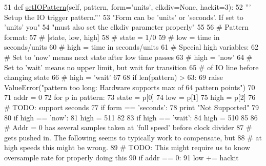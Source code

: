 \begin{DoxyCode}
51     \textcolor{keyword}{def }\hyperlink{classsoftware_1_1chipwhisperer_1_1capture_1_1scopes_1_1cwhardware_1_1ChipWhispererDigitalPattern_1_1CWAdvTrigger_ad9a576c7c914745abaf8c88af8461961}{setIOPattern}(self, pattern, form='units', clkdiv=None, hackit=3):
52         \textcolor{stringliteral}{''' Setup the IO trigger pattern.'''}
53         \textcolor{stringliteral}{"Form can be 'units' or 'seconds'. If set to 'units' you"}
54         \textcolor{stringliteral}{"must also set the clkdiv parameter properly"}
55 
56         \textcolor{comment}{# Pattern format:}
57         \textcolor{comment}{# [state, low, high]}
58         \textcolor{comment}{# state = 1/0}
59         \textcolor{comment}{# low = time in seconds/units}
60         \textcolor{comment}{# high = time in seconds/units}
61         \textcolor{comment}{# Special high variables:}
62         \textcolor{comment}{# Set to 'now' means next state after low time passes}
63         \textcolor{comment}{# high = 'now'}
64         \textcolor{comment}{# Set to 'wait' means no upper limit, but wait for transition}
65         \textcolor{comment}{# of IO line before changing state}
66         \textcolor{comment}{# high = 'wait'}
67 
68         \textcolor{keywordflow}{if} len(pattern) > 63:
69             \textcolor{keywordflow}{raise} ValueError(\textcolor{stringliteral}{"pattern too long: Hardware supports max of 64 pattern points"})
70 
71         addr = 0
72         \textcolor{keywordflow}{for} p \textcolor{keywordflow}{in} pattern:
73             state = p[0]
74             low = p[1]
75             high = p[2]
76             \textcolor{comment}{# TODO: support seconds}
77             \textcolor{keywordflow}{if} form == \textcolor{stringliteral}{'seconds'}:
78                 \textcolor{keywordflow}{print} \textcolor{stringliteral}{"Not Supported"}
79 
80             \textcolor{keywordflow}{if} high == \textcolor{stringliteral}{'now'}:
81                 high = 511
82 
83             \textcolor{keywordflow}{if} high == \textcolor{stringliteral}{'wait'}:
84                 high = 510
85 
86             \textcolor{comment}{# Addr = 0 has several samples taken at 'full speed' before clock divider}
87             \textcolor{comment}{# gets pushed in. The following seems to typically work to compensate, but}
88             \textcolor{comment}{# at high speeds this might be wrong.}
89             \textcolor{comment}{# TODO: This might require us to know oversample rate for properly doing this}
90             \textcolor{keywordflow}{if} addr == 0:
91                 low += hackit

\end{DoxyCode}
